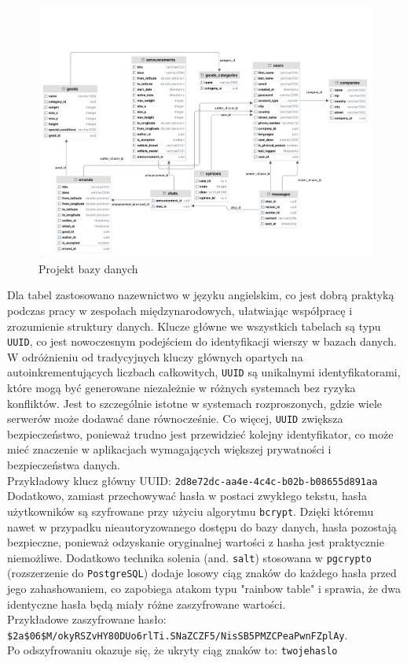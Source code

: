 \begin{figure}[H]
	\centering
		\includegraphics[width=1\linewidth]{rozdzial1/baza_danych.jpg}
	\caption{Projekt bazy danych}
	\label{Rys. fig:Projekt bazy danych}
\end{figure}

Dla tabel zastosowano nazewnictwo w języku angielskim, co jest dobrą praktyką podczas pracy w zespołach międzynarodowych, ułatwiając współpracę i zrozumienie struktury danych. Klucze główne we wszystkich tabelach są typu \texttt{UUID}, co jest nowoczesnym podejściem do identyfikacji wierszy w bazach danych. W odróżnieniu od tradycyjnych kluczy głównych opartych na autoinkrementujących liczbach całkowitych, \texttt{UUID} są unikalnymi identyfikatorami, które mogą być generowane niezależnie w różnych systemach bez ryzyka konfliktów. Jest to szczególnie istotne w systemach rozproszonych, gdzie wiele serwerów może dodawać dane równocześnie. Co więcej, \texttt{UUID} zwiększa bezpieczeństwo, ponieważ trudno jest przewidzieć kolejny identyfikator, co może mieć znaczenie w aplikacjach wymagających większej prywatności i bezpieczeństwa danych. \\
Przykładowy klucz główny UUID: \texttt{2d8e72dc-aa4e-4c4c-b02b-b08655d891aa} \\

Dodatkowo, zamiast przechowywać hasła w postaci zwykłego tekstu, hasła użytkowników są szyfrowane przy użyciu algorytmu \texttt{bcrypt}. Dzięki któremu nawet w przypadku nieautoryzowanego dostępu do bazy danych, hasła pozostają bezpieczne, ponieważ odzyskanie oryginalnej wartości z hasha jest praktycznie niemożliwe. Dodatkowo technika solenia (and. \texttt{salt}) stosowana w \texttt{pgcrypto} (rozszerzenie do \texttt{PostgreSQL}) dodaje losowy ciąg znaków do każdego hasła przed jego zahashowaniem, co zapobiega atakom typu "rainbow table" i sprawia, że dwa identyczne hasła będą miały różne zaszyfrowane wartości. \\
Przykładowe zaszyfrowane hasło: \\
\texttt{\$2a\$06\$M/okyRSZvHY80DUo6rlTi.SNaZCZF5/NisSB5PMZCPeaPwnFZplAy}. \\
Po odszyfrowaniu okazuje się, że ukryty ciąg znaków to: \texttt{twojehaslo}
